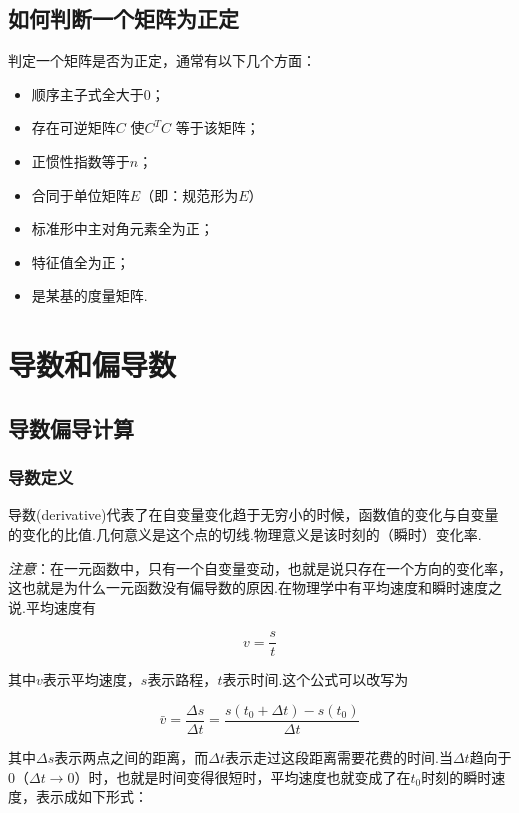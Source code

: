 \subsection{如何判断一个矩阵为正定}
\label{ux5982ux4f55ux5224ux65adux4e00ux4e2aux77e9ux9635ux4e3aux6b63ux5b9a}

判定一个矩阵是否为正定，通常有以下几个方面：

\begin{itemize}
 
\item
  顺序主子式全大于0；
\item
  存在可逆矩阵\(C\) 使\(C^TC\) 等于该矩阵；
\item
  正惯性指数等于\(n\)；
\item
  合同于单位矩阵\(E\)（即：规范形为\(E\)）
\item
  标准形中主对角元素全为正；
\item
  特征值全为正；
\item
  是某基的度量矩阵.
\end{itemize}

\section{导数和偏导数}
\label{ux5bfcux6570ux548cux504fux5bfcux6570}
\subsection{导数偏导计算}
\label{ux5bfcux6570ux504fux5bfcux8ba1ux7b97}
\subsubsection{导数定义}
\label{sec:2.1.1}

导数(derivative)代表了在自变量变化趋于无穷小的时候，函数值的变化与自变量的变化的比值.几何意义是这个点的切线.物理意义是该时刻的（瞬时）变化率.
​

\emph{注意}：在一元函数中，只有一个自变量变动，也就是说只存在一个方向的变化率，这也就是为什么一元函数没有偏导数的原因.在物理学中有平均速度和瞬时速度之说.平均速度有

\[
v=\frac{s}{t}
\]

其中\(v\)表示平均速度，\(s\)表示路程，\(t\)表示时间.这个公式可以改写为

\[
\bar{v}=\frac{\Delta s}{\Delta t}=\frac{s(t_0+\Delta t)-s(t_0)}{\Delta t}
\]

其中\(\Delta s\)表示两点之间的距离，而\(\Delta t\)表示走过这段距离需要花费的时间.当\(\Delta t\)趋向于0（\(\Delta t \to 0\)）时，也就是时间变得很短时，平均速度也就变成了在\(t_0\)时刻的瞬时速度，表示成如下形式：

